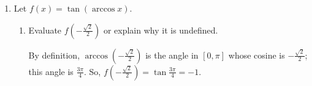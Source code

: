 \documentclass{article}
\begin{document}
\begin{enumerate}
\begin{solution}
    \begin{align}
        \frac{d}{dt}\left(\tan \theta \right) &= \frac{d}{dt} \left( \frac{x}{500} \right) \\
        \sec^2\theta \cdot \frac{d\theta}{dt} &= \frac{1}{500} \cdot \frac{dx}{dt}
    \end{align}

    \textcolor{red}{Finally, we'll plug in our snapshot information and solve for what we're looking for. (In this case, $\frac{d\theta}{dt}$.)}

    \[\sec^2\theta \cdot \frac{d\theta}{dt} = \frac{1}{500} \cdot 50\]

    Since the triangle in our snapshot is an isosceles triangle, at this moment, $\theta=\frac{\pi}{4}$. Plugging this into our above equation,

    \begin{align}
        \sec^2(\frac{\pi}{4}) \cdot \frac{d\theta}{dt} &= \frac{1}{500} \cdot 50\\
        \frac{1}{\cos^2(\frac{\pi}{4})} \cdot \frac{d\theta}{dt} &= \frac{1}{500} \cdot 50\\
        \frac{1}{(\frac{1}{\sqrt{2}})^2} \cdot \frac{d\theta}{dt} &= \frac{1}{500} \cdot 50\\
        \frac{1}{\frac{1}{2}} \cdot \frac{d\theta}{dt} &= \frac{1}{500} \cdot 50\\
        2 \cdot \frac{d\theta}{dt} &= \frac{1}{500} \cdot 50
    \end{align}

    So $\boxed{\frac{d\theta}{dt} = \frac{1}{20}} \text{ radians/second}$.

    

    
\end{solution}

\item \label{inverse-trig-composition-2}
 
 Let $f(x) = \tan(\arccos x)$.

  \begin{enumerate}
  \item
    \begin{problem}[\vfill]
      Evaluate $f \left( - \frac{\sqrt{2}}{2} \right)$ or explain why it is
      undefined. 
    \end{problem}

    \begin{solution}
      By definition, $\arccos \left( - \frac{\sqrt{2}}{2} \right)$ is the
      angle in $[0, \pi]$ whose cosine is $- \frac{\sqrt{2}}{2}$; this
      angle is $\frac{3 \pi}{4}$.  So, $f \left( - \frac{\sqrt{2}}{2}
      \right) = \tan \frac{3 \pi}{4} = \boxed{-1}$. 
    \end{solution}


\end{enumerate}
\end{enumerate}
\end{document}
